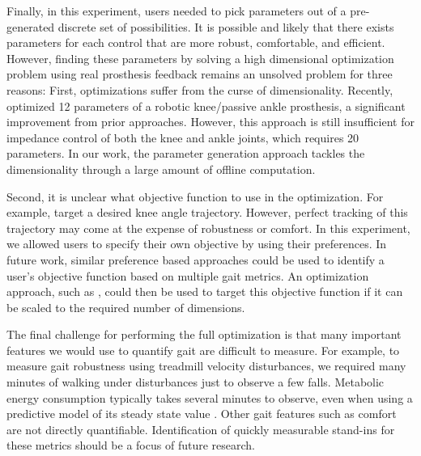Finally, in this experiment, users needed to pick parameters out of a
pre-generated discrete set of possibilities. It is possible and likely that there
exists parameters for each control that are more robust, comfortable, and
efficient. However, finding these parameters by solving a high dimensional
optimization problem using real prosthesis feedback remains an unsolved problem
for three reasons: First, optimizations suffer from the curse of dimensionality.
Recently, \citet{wen2019online} optimized 12 parameters of a robotic
knee/passive ankle prosthesis, a significant improvement from prior approaches.
However, this approach is still insufficient for impedance control of both the
knee and ankle joints, which requires 20 parameters. In our work, the parameter
generation approach tackles the dimensionality through a large amount of offline
computation.

Second, it is unclear what objective function to use in the optimization. For
example, \citet{wen2019online} target a desired knee angle trajectory. However,
perfect tracking of this trajectory may come at the expense of robustness or
comfort. In this experiment, we allowed users to specify their own objective by
using their preferences. In future work, similar preference based approaches could
be used to identify a user's objective function based on multiple gait metrics.
An optimization approach, such as \citet{wen2019online}, could then be used to
target this objective function if it can be scaled to the required number of
dimensions.

The final challenge for performing the full optimization is that many important
features we would use to quantify gait are difficult to measure. For example, to
measure gait robustness using treadmill velocity disturbances, we required many
minutes of walking under disturbances just to observe a few falls. Metabolic
energy consumption typically takes several minutes to observe, even when using a
predictive model of its steady state value \citep{zhang2017human}. Other gait
features such as comfort are not directly quantifiable. Identification of
quickly measurable stand-ins for these metrics should be a focus of future
research.
